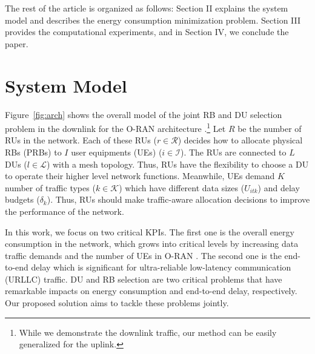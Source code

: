 \documentclass[conference]{IEEEtran}
\begin{document}
The rest of the article is organized as follows: Section II explains the system model and describes the energy consumption minimization problem. Section III provides the computational experiments, and in Section IV, we conclude the paper.


\section{System Model}
\par Figure~\ref{fig:arch} shows the overall model of the joint RB and DU selection problem in the downlink for the O-RAN architecture \cite{O-RANAlliance2020}.\footnote{While we demonstrate the downlink traffic, our method can be easily generalized for the uplink.} Let $R$ be the number of RUs in the network. Each of these RUs ($r\in\mathcal{R}$) decides how to allocate physical RBs (PRBs) to $I$ user equipments (UEs) ($i\in\mathcal{I}$). The RUs are connected to $L$ DUs ($l\in\mathcal{L}$) with a mesh topology. Thus, RUs have the flexibility to choose a DU to operate their higher level network functions. Meanwhile, UEs demand $K$ number of traffic types ($k\in\mathcal{K}$) which have different data sizes ($U_{itk}$) and delay budgets ($\delta_{k}$). Thus, RUs should make traffic-aware allocation decisions to improve the performance of the network.

\par In this work, we focus on two critical KPIs. The first one is the overall energy consumption in the network, which grows into critical levels by increasing data traffic demands and the number of UEs in O-RAN \cite{Pamuklu2021}. The second one is the end-to-end delay which is significant for ultra-reliable low-latency communication (URLLC) traffic. DU and RB selection are two critical problems that have remarkable impacts on energy consumption and end-to-end delay, respectively. Our proposed solution aims to tackle these problems jointly. 
\end{document}
